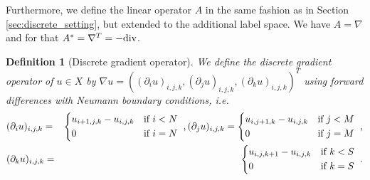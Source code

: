 \documentclass[abstracton]{scrreprt}
\newtheorem{definition}[theorem]{Definition}
\begin{document}
        Furthermore, we define the linear operator $A$ in the same fashion as in Section \ref{sec:discrete_setting}, but extended to the additional label space. We have $A = \nabla$ and for that $A^{\ast} = \nabla^{T} = -\textnormal{div}$.
        \begin{definition}[Discrete gradient operator] %
        \label{def:discrete_gradient_operator_ms}
            We define the discrete gradient operator of $u \in X$ by $\nabla u = ((\partial_{i}u)_{i,j,k}, (\partial_{j}u)_{i,j,k}, (\partial_{k}u)_{i,j,k})^{T}$ using forward differences with Neumann boundary conditions, i.e.
                \begin{eqnarray}
                    &(\partial_{i}u)_{i,j,k} =&
                        \begin{dcases*}
                            u_{i+1, j, k} - u_{i, j, k} & \textnormal{if $i < N$} \\
                            0 & \textnormal{if $i = N$}
                        \end{dcases*},
                    \notag
                    (\partial_{j}u)_{i, j, k} =
                        \begin{dcases*}
                            u_{i, j+1, k} - u_{i, j, k} & \textnormal{if $j < M$} \\
                            0 & \textnormal{if $j = M$}
                        \end{dcases*},
                    \notag \\
                    &(\partial_{k}u)_{i, j, k} =&
                        \begin{dcases*}
                            u_{i, j, k+1} - u_{i, j, k} & \textnormal{if $k < S$} \\
                            0 & \textnormal{if $k = S$}
                        \end{dcases*}.
                    \notag
                \end{eqnarray}
        \end{definition}
\end{document}
